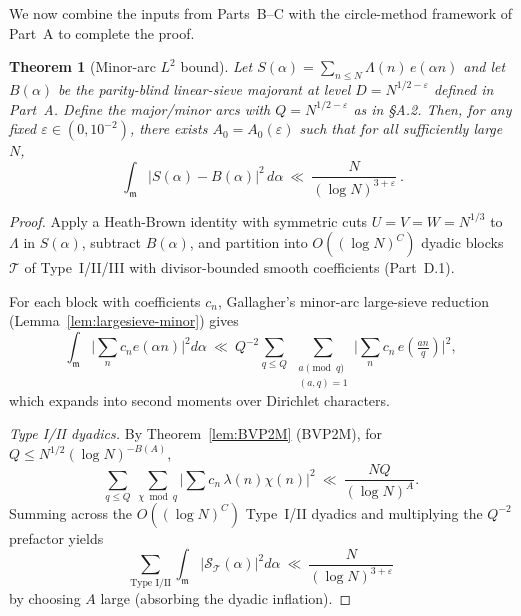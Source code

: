\documentclass[11pt]{article}
\newtheorem{theorem}[lemma]{Theorem}
\theoremstyle{definition}
\theoremstyle{remark}
\numberwithin{equation}{part}
\begin{document}
We now combine the inputs from Parts~B--C with the circle-method framework of Part~A to complete the proof.

\begin{theorem}[Minor-arc $L^2$ bound]\label{thm:minorA1_proved}
	Let $S(\alpha)=\sum_{n\le N}\Lambda(n)\,e(\alpha n)$ and let $B(\alpha)$ be the parity-blind linear-sieve majorant at level $D=N^{1/2-\varepsilon}$ defined in Part~A.
	Define the major/minor arcs with $Q=N^{1/2-\varepsilon}$ as in \S A.2.
	Then, for any fixed $\varepsilon\in (0,10^{-2})$, there exists $A_0=A_0(\varepsilon)$ such that for all sufficiently large $N$,
	\[
		\boxed{\ \ \int_{\mathfrak m}\!\bigl|S(\alpha)-B(\alpha)\bigr|^{2}\,d\alpha
			\ \ll\ \frac{N}{(\log N)^{3+\varepsilon}}\ .\ }
	\]
\end{theorem}

\begin{proof}
	Apply a Heath-Brown identity with symmetric cuts $U=V=W=N^{1/3}$ to $\Lambda$ in $S(\alpha)$, subtract $B(\alpha)$, and partition into $O((\log N)^C)$ dyadic blocks $\mathcal T$ of Type~I/II/III with divisor-bounded smooth coefficients (Part~D.1).

	For each block with coefficients $c_n$, Gallagher's minor-arc large-sieve reduction (Lemma~\ref{lem:largesieve-minor}) gives
	\[
		\int_{\mathfrak m}\Big|\sum_n c_n e(\alpha n)\Big|^2 d\alpha
		\ \ll\ Q^{-2}\!
		\sum_{q\le Q}\ \sum_{\substack{a\!\!\!\pmod q\\ (a,q)=1}}
		\Big|\sum_n c_n\,e\!\left(\tfrac{an}{q}\right)\Big|^2,
	\]
	which expands into second moments over Dirichlet characters.

	\emph{Type I/II dyadics.} By Theorem~\ref{lem:BVP2M} (BVP2M), for $Q\le N^{1/2}(\log N)^{-B(A)}$,
	\[
		\sum_{q\le Q}\ \sum_{\chi\bmod q}\Big|\sum c_n\,\lambda(n)\chi(n)\Big|^2
		\ \ll\ \frac{NQ}{(\log N)^A}.
	\]
	Summing across the $O((\log N)^C)$ Type~I/II dyadics and multiplying the $Q^{-2}$ prefactor yields
	\[
		\sum_{\text{Type I/II}}\int_{\mathfrak m}|\mathcal S_{\mathcal T}(\alpha)|^2 d\alpha
		\ \ll\ \frac{N}{(\log N)^{3+\varepsilon}}
	\]
	by choosing $A$ large (absorbing the dyadic inflation).


\end{proof}
\end{document}
